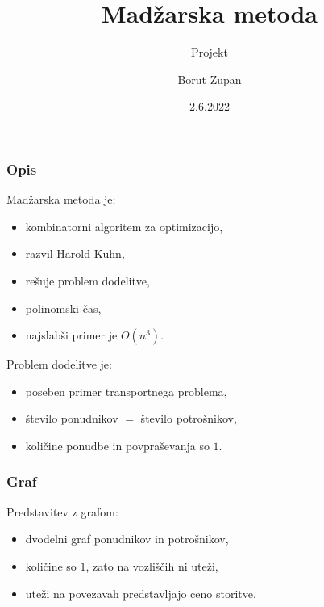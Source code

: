 \documentclass{beamer}
\begin{document}
\title{Madžarska metoda}
\subtitle{Projekt}
\author{Borut Zupan}
\date{2.6.2022}

\begin{frame}
\titlepage
\end{frame}

\begin{frame}
\frametitle{Opis}
    \begin{block}{}
        Madžarska metoda je:
        \begin{itemize}
            \item kombinatorni algoritem za optimizacijo,
            \item razvil Harold Kuhn,
            \item rešuje problem dodelitve,
            \item polinomski čas,
            \item najslabši primer je $O(n^3)$.
        \end{itemize}
        \hfill \break

        Problem dodelitve je:
        \begin{itemize}
            \item poseben primer transportnega problema,
            \item število ponudnikov $=$ število potrošnikov,
            \item količine ponudbe in povpraševanja so $1$.
        \end{itemize}
    \end{block}
\end{frame}

\begin{frame}
\frametitle{Graf}
    \begin{block}{} 
        Predstavitev z grafom:
        \begin{itemize}
            \item dvodelni graf ponudnikov in potrošnikov,
            \item količine so $1$, zato na vozliščih ni uteži,
            \item uteži na povezavah predstavljajo ceno storitve.
        \end{itemize}
    \end{block} 
\end{frame}
\end{document}
